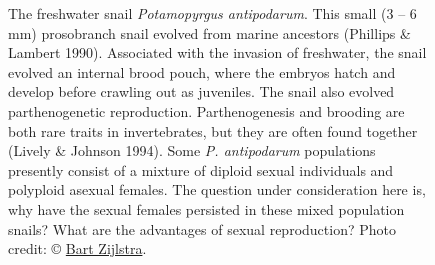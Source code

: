 \documentclass[
  letterpaper,
]{book}
\begin{document}
\begin{figure}


\caption[The freshwater snail \emph{Potamopyrgus
antipodarum}]{\label{fig-3-4}The freshwater snail \emph{Potamopyrgus
antipodarum}. This small (3 -- 6 mm) prosobranch snail evolved from
marine ancestors (Phillips \& Lambert 1990). Associated with the
invasion of freshwater, the snail evolved an internal brood pouch, where
the embryos hatch and develop before crawling out as juveniles. The
snail also evolved parthenogenetic reproduction. Parthenogenesis and
brooding are both rare traits in invertebrates, but they are often found
together (Lively \& Johnson 1994). Some \emph{P. antipodarum}
populations presently consist of a mixture of diploid sexual individuals
and polyploid asexual females. The question under consideration here is,
why have the sexual females persisted in these mixed population snails?
What are the advantages of sexual reproduction? Photo credit: ©
\href{https://www.bartzijlstra.com}{Bart Zijlstra}.}

\end{figure}%
\end{document}
